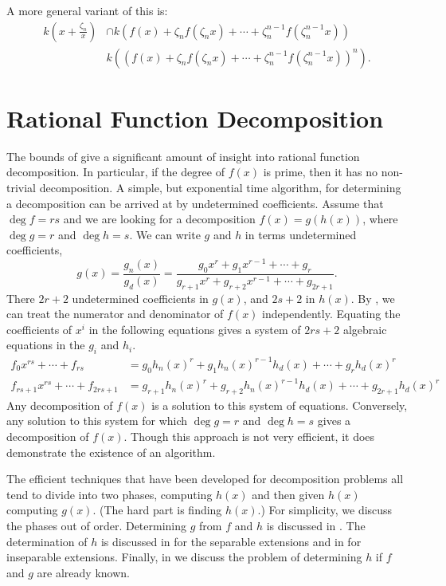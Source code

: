 A more general variant of this is:
\[
\begin{aligned}
k\left(x + \frac{\zeta_n}{x}\right) &\cap 
k\left(f(x) + \zeta_n f(\zeta_n x) + \cdots +
\zeta_n^{n-1}f(\zeta_n^{n-1}x)\right) \\
&k\left(\left(f(x) + \zeta_n f(\zeta_n x) + \cdots +
\zeta_n^{n-1}f(\zeta_n^{n-1}x)\right)^n\right).
\end{aligned}
\]


\section{Rational Function Decomposition}
\label{Rational:Function:Decomposition:Sec}

The bounds of  give a significant amount
of insight into rational function decomposition.  In particular, if
the degree of $f(x)$ is prime, then it has no non-trivial
decomposition.  A simple, but exponential time algorithm, for
determining a decomposition can be arrived at by undetermined
coefficients.  Assume that $\deg f = rs$ and we are looking for a
decomposition $f(x) = g(h(x))$, where $\deg g = r$ and $\deg h = s$.
We can write $g$ and $h$ in terms undetermined coefficients, \eg
\[
g(x) = \frac{g_n(x)}{g_d(x)} = \frac{g_{0} x^r + g_{1} x^{r-1} + 
\cdots + g_{r}}{g_{r+1}x^r + g_{r+2} x^{r-1} + \cdots + g_{2r+1}}.
\]
There $2r+2$ undetermined coefficients in $g(x)$, and $2s+2$ in $h(x)$.
By , we can treat the numerator and denominator of
$f(x)$ independently.  Equating the coefficients of $x^i$ in the following
equations gives a system of $2rs+2$ algebraic equations in the $g_i$ and
$h_i$. 
\begin{equation}
\label{Decomposition:Equations:Eq}
\begin{aligned}
f_0 x^{rs} + \cdots + f_{rs} 
   & = g_0 h_n(x)^r + g_1 h_n(x)^{r-1} h_d(x) + \cdots + g_r h_d(x)^r \\
f_{rs+1} x^{rs} + \cdots + f_{2rs+1} 
   & = g_{r+1} h_n(x)^r + g_{r+2} h_n(x)^{r-1} h_d(x) + 
   \cdots + g_{2r+1} h_d(x)^r
\end{aligned}
\end{equation}
Any decomposition of $f(x)$ is a solution to this system of equations.
Conversely, any solution to this system for which $\deg g = r$ and $\deg h =
s$ gives a decomposition of $f(x)$.  Though this approach is not very
efficient, it does demonstrate the existence of an algorithm.

The efficient techniques that have been developed for decomposition
problems all tend to divide into two phases, computing $h(x)$ and then
given $h(x)$ computing $g(x)$.  (The hard part is finding $h(x)$.)
For simplicity, we discuss the phases out of order.  Determining $g$
from $f$ and $h$ is discussed in .  The
determination of $h$ is discussed in  for the
separable extensions and in  for
inseparable extensions.  Finally, in  we
discuss the problem of determining $h$ if $f$ and $g$ are already
known. 


